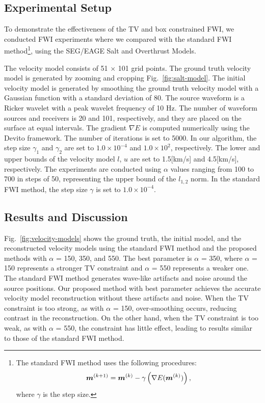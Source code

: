 

\subsection{Experimental Setup} \label{subsec:experimental-setup}

To demonstrate the effectiveness of the TV and box constrained FWI, we conducted FWI experiments where we compared with the standard FWI method\footnote{
    The standard FWI method uses the following procedures:
    \begin{equation} \label{eq:FWIWithGradient} \bm{m}^{(k+1)} = \bm{m}^{(k)} - \gamma \left( \nabla E(\bm{m}^{(k)}) \right), \end{equation} where $\gamma$ is the step size.
}\cite{FWI0}, using the SEG/EAGE Salt and Overthrust Models.

The velocity model consists of 51 $\times$ 101 grid points.
The ground truth velocity model is generated by zooming and cropping Fig.~\ref{fig:salt-model}.
The initial velocity model is generated by smoothing the ground truth velocity model with a Gaussian function with a standard deviation of 80.
The source waveform is a Ricker wavelet with a peak wavelet frequency of 10 Hz.
The number of waveform sources and receivers is 20 and 101, respectively, and they are placed on the surface at equal intervals.
The gradient $\nabla E$ is computed numerically using the Devito framework\cite{devito}.
The number of iterations is set to 5000.
In our algorithm, the step size $\gamma_1$ and $\gamma_2$ are set to $1.0 \times 10^{-4}$ and $1.0 \times 10^2$, respectively.
The lower and upper bounds of the velocity model $l$, $u$ are set to 1.5[km/s] and 4.5[km/s], respectively.
The experiments are conducted using $\alpha$ values ranging from 100 to 700 in steps of 50, representing the upper bound of the $l_{1,2}$ norm.
In the standard FWI method, the step size $\gamma$ is set to $1.0 \times 10^{-4}$.





\subsection{Results and Discussion} \label{subsec:results-and-discussion}

Fig.~\ref{fig:velocity-models} shows the ground truth, the initial model, and the reconstructed velocity models using the standard FWI method and the proposed methods with $\alpha$ = 150, 350, and 550.
The best parameter is $\alpha$ = 350, where $\alpha$ = 150 represents a stronger TV constraint and $\alpha$ = 550 represents a weaker one.
The standard FWI method generates wave-like artifacts and noise around the source positions.
Our proposed method with best parameter achieves the accurate velocity model reconstruction without these artifacts and noise.
When the TV constraint is too strong, as with $\alpha$ = 150, over-smoothing occurs, reducing contrast in the reconstruction.
On the other hand, when the TV constraint is too weak, as with $\alpha$ = 550, the constraint has little effect, leading to results similar to those of the standard FWI method.

